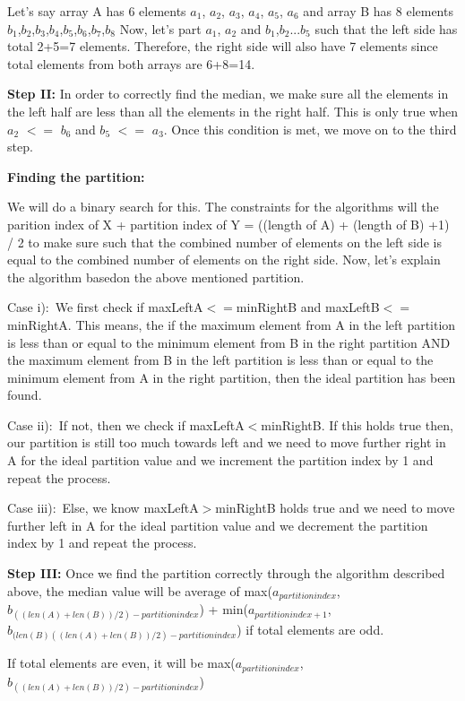 \documentclass[letterpaper,11pt]{article}
\begin{document}
Let's say array A has 6 elements $a_{1}$, $a_{2}$, $a_{3}$, $a_{4}$, $a_{5}$, $a_{6}$ and array B has 8 elements $b_{1}$,$b_{2}$,$b_{3}$,$b_{4}$,$b_{5}$,$b_{6}$,$b_{7}$,$b_{8}$
Now, let's part $a_{1}$, $a_{2}$ and $b_{1}$,$b_{2}$...$b_{5}$ such that the left side has total 2+5=7 elements. Therefore, the right side will also have 7 elements since total elements from both arrays are 6+8=14. 

\textbf{Step II: } In order to correctly find the median,  we make sure all the elements in the left half are less than all the elements in the right half. This is only true when $a_{2}$ $<=$ $b_{6}$ and $b_{5}$ $<=$ $a_{3}$. Once this condition is met, we move on to the third step.

\textbf{Finding the partition:}

We will do a binary search for this. The constraints for the algorithms will the parition index of X + partition index of Y = ((length of A) + (length of B) +1) / 2 to make sure such that the combined number of elements on the left side is equal to the combined number of elements on the right side. 
Now, let's explain the algorithm basedon the above mentioned partition. 

Case i)$:$ We first check if maxLeftA$<=$minRightB and maxLeftB$<=$minRightA. This means, the if the maximum element from A in the left partition is less than or equal to the minimum element from B in the right partition AND the maximum element from B in the left partition is less than or equal to the minimum element from A in the right partition, then the ideal partition has been found. 

Case ii)$:$ If not, then we check if maxLeftA$<$minRightB. If this holds true then, our partition is still too much towards left and we need to move further right in A for the ideal partition value and we increment the partition index by 1 and repeat the process.

Case iii)$:$ Else, we know maxLeftA$>$minRightB holds true and we need to move further left in A for the ideal partition value and we decrement the partition index by 1 and repeat the process.

\textbf{Step III: } Once we find the partition correctly through the algorithm described above, the median value will be average of max($a_{partition index}$,$b_{((len(A)+len(B))/2)-partitionindex}$) + min($a_{partition index+1}$,$b_{(len(B)((len(A)+len(B))/2)-partitionindex}$) if total elements are odd. 

If total elements are even, it will be max($a_{partitionindex}$,$b_{((len(A)+len(B))/2)-partitionindex}$)
\end{document}

